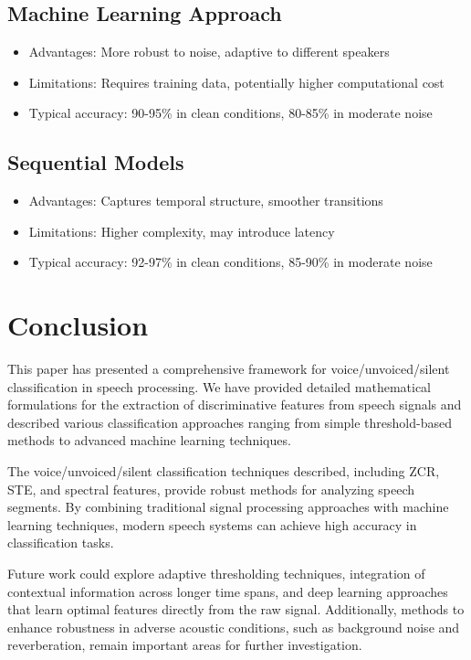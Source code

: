 \documentclass[10pt,journal,compsoc]{IEEEtran}
\begin{document}
\subsection{Machine Learning Approach}
\begin{itemize}
    \item Advantages: More robust to noise, adaptive to different speakers
    \item Limitations: Requires training data, potentially higher computational cost
    \item Typical accuracy: 90-95\% in clean conditions, 80-85\% in moderate noise
\end{itemize}

\subsection{Sequential Models}
\begin{itemize}
    \item Advantages: Captures temporal structure, smoother transitions
    \item Limitations: Higher complexity, may introduce latency
    \item Typical accuracy: 92-97\% in clean conditions, 85-90\% in moderate noise
\end{itemize}

\section{Conclusion}
This paper has presented a comprehensive framework for voice/unvoiced/silent classification in speech processing. We have provided detailed mathematical formulations for the extraction of discriminative features from speech signals and described various classification approaches ranging from simple threshold-based methods to advanced machine learning techniques.

The voice/unvoiced/silent classification techniques described, including ZCR, STE, and spectral features, provide robust methods for analyzing speech segments. By combining traditional signal processing approaches with machine learning techniques, modern speech systems can achieve high accuracy in classification tasks.

Future work could explore adaptive thresholding techniques, integration of contextual information across longer time spans, and deep learning approaches that learn optimal features directly from the raw signal. Additionally, methods to enhance robustness in adverse acoustic conditions, such as background noise and reverberation, remain important areas for further investigation.
\end{document}
